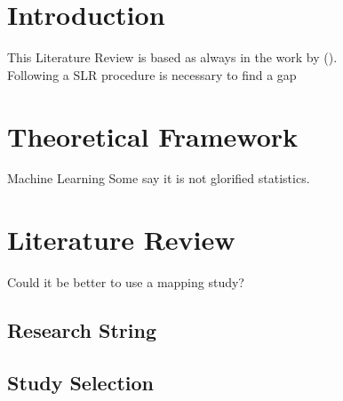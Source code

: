 \section{Introduction}
\normalem
This Literature Review is based as always in the work by \citeauthor{Kitchenham2007} (\citeyear{Kitchenham2007}). \lipsum[4]\\

Following a SLR procedure is necessary to find a gap \parencite{Kitchenham2007}
\section{Theoretical Framework}

\begin{definition}{Machine Learning}
Some say it is not glorified statistics.
\end{definition}

\section{Literature Review}
Could it be better to use a mapping study?
\subsection{Research String}
\lipsum[5]
\subsection{Study Selection}